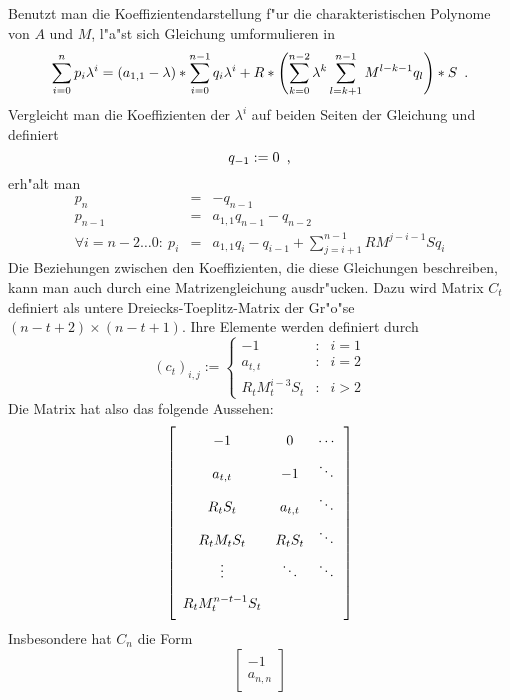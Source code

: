 Benutzt man die Koeffizientendarstellung f"ur die charakteristischen
Polynome von $A$ und $M$, l"a"st sich Gleichung
 umformulieren in
\[
   \sum_{i=0}^n p_i \lambda^i =
       (a_{1,1} - \lambda) * \sum_{i=0}^{n-1} q_i \lambda^i
       + R * \left(
         \sum_{k=0}^{n-2} \lambda^{k} \sum_{l=k+1}^{n-1} M^{l-k-1} q_l
       \right) * S  
   \mbox{\hspace{0.5em}.}
\]
Vergleicht man die Koeffizienten der $\lambda^i$ auf beiden Seiten
der Gleichung und definiert \[ q_{-1} := 0 \mbox{\hspace{0.5em},} \] erh"alt man
\begin{eqnarray}
    p_n     & = & -q_{n-1}                 \label{Equ1Berk84KoeffVergl}
\\  p_{n-1} & = & a_{1,1}q_{n-1} - q_{n-2} \label{Equ2Berk84KoeffVergl}
\\  \forall i=n-2 \ldots 0 : \: p_i & = &  \label{Equ3Berk84KoeffVergl}
        a_{1,1}q_i-q_{i-1}+\sum_{j=i+1}^{n-1}RM^{j-i-1}S q_i
\end{eqnarray}
Die Beziehungen zwischen den Koeffizienten, die diese Gleichungen
beschreiben, kann man auch durch eine Matrizengleichung 
ausdr"ucken. Dazu
wird Matrix $C_t$ definiert als untere Dreiecks-Toeplitz-Matrix der
Gr"o"se $(n-t+2) \times (n-t+1)$. Ihre Elemente werden definiert durch
\[ (c_t)_{i,j} :=
       \left\{
           \begin{array}{lcr}
               -1                       & : & i=1
            \\ a_{t,t}                  & : & i=2
            \\ R_t M_t^{i-3} S_t        & : & i>2
           \end{array}
       \right.
\]
Die Matrix hat also das folgende Aussehen:
\[
    \left[ \begin{array}{ccc}
        -1                   & 0         & \cdots \MatStrut
    \\  a_{t,t}              & -1        & \ddots \MatStrut
    \\  R_t S_t              & a_{t,t}   & \ddots \MatStrut
    \\  R_t M_t S_t          & R_t S_t   & \ddots \MatStrut
    \\  \vdots               & \ddots    & \ddots \MatStrut
    \\  R_t M_t^{n-t-1} S_t  &           &        \MatStrut
    \end{array} \right]
\] \MyPunktA{30em} 
Insbesondere hat $C_n$ die Form
\[ 
    \left[ \begin{array}{c}
    -1 \\ a_{n,n}
    \end{array} \right]
\]

